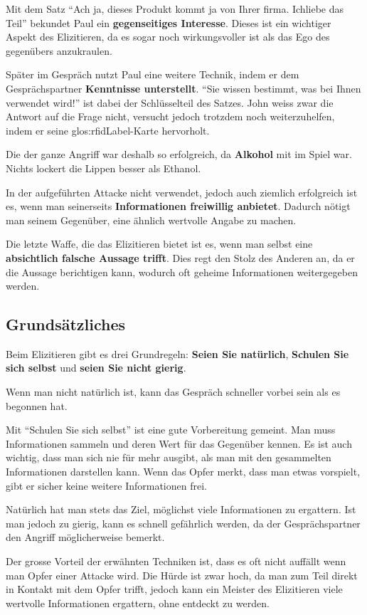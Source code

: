 Mit dem Satz "`Ach ja, dieses Produkt kommt ja von Ihrer firma. Ichliebe das Teil"' bekundet Paul ein \textbf{gegenseitiges Interesse}. Dieses ist ein wichtiger Aspekt des Elizitieren, da es sogar noch wirkungsvoller ist als das Ego des gegenübers anzukraulen.

Später im Gespräch nutzt Paul eine weitere Technik, indem er dem Gesprächspartner \textbf{Kenntnisse unterstellt}. "`Sie wissen bestimmt, was bei Ihnen verwendet wird!"' ist dabei der Schlüsselteil des Satzes. John weiss zwar die Antwort auf die Frage nicht, versucht jedoch trotzdem noch weiterzuhelfen, indem er seine \gls{glos:rfidLabel}-Karte hervorholt.

Die der ganze Angriff war deshalb so erfolgreich, da \textbf{Alkohol} mit im Spiel war. Nichts lockert die Lippen besser als Ethanol.

In der aufgeführten Attacke nicht verwendet, jedoch auch ziemlich erfolgreich ist es, wenn man seinerseits \textbf{Informationen freiwillig anbietet}. Dadurch nötigt man seinem Gegenüber, eine ähnlich wertvolle Angabe zu machen.

Die letzte Waffe, die das Elizitieren bietet ist es, wenn man selbst eine \textbf{absichtlich falsche Aussage trifft}. Dies regt den Stolz des Anderen an, da er die Aussage berichtigen kann, wodurch oft geheime Informationen weitergegeben werden.

\subsection{Grundsätzliches}
Beim Elizitieren gibt es drei Grundregeln: \textbf{Seien Sie natürlich}, \textbf{Schulen Sie sich selbst} und \textbf{seien Sie nicht gierig}. 

Wenn man nicht natürlich ist, kann das Gespräch schneller vorbei sein als es begonnen hat. 

Mit "`Schulen Sie sich selbst"' ist eine gute Vorbereitung gemeint. Man muss Informationen sammeln und deren Wert für das Gegenüber kennen. Es ist auch wichtig, dass man sich nie für mehr ausgibt, als man mit den gesammelten Informationen darstellen kann. Wenn das Opfer merkt, dass man etwas vorspielt, gibt er sicher keine weitere Informationen frei.

Natürlich hat man stets das Ziel, möglichst viele Informationen zu ergattern. Ist man jedoch zu gierig, kann es schnell gefährlich werden, da der Gesprächspartner den Angriff möglicherweise bemerkt.

Der grosse Vorteil der erwähnten Techniken ist, dass es oft nicht auffällt wenn man Opfer einer Attacke wird. Die Hürde ist zwar hoch, da man zum Teil direkt in Kontakt mit dem Opfer trifft, jedoch kann ein Meister des Elizitieren viele wertvolle Informationen ergattern, ohne entdeckt zu werden.


